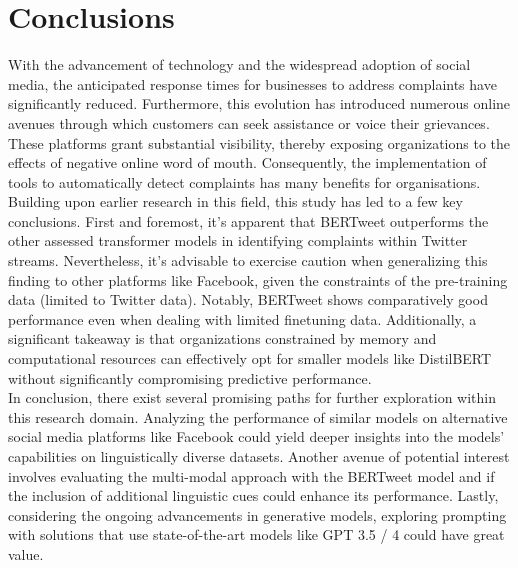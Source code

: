 \chapter{Conclusions}

With the advancement of technology and the widespread adoption of social media, the anticipated response times for businesses to address complaints have significantly reduced. Furthermore, this evolution has introduced numerous online avenues through which customers can seek assistance or voice their grievances. These platforms grant substantial visibility, thereby exposing organizations to the effects of negative online word of mouth. Consequently, the implementation of tools to automatically detect complaints has many benefits for organisations.\\

Building upon earlier research in this field, this study has led to a few key conclusions. First and foremost, it's apparent that BERTweet outperforms the other assessed transformer models in identifying complaints within Twitter streams. Nevertheless, it's advisable to exercise caution when generalizing this finding to other platforms like Facebook, given the constraints of the pre-training data (limited to Twitter data). Notably, BERTweet shows comparatively good performance even when dealing with limited finetuning data. Additionally, a significant takeaway is that organizations constrained by memory and computational resources can effectively opt for smaller models like DistilBERT without significantly compromising predictive performance.\\

In conclusion, there exist several promising paths for further exploration within this research domain. Analyzing the performance of similar models on alternative social media platforms like Facebook could yield deeper insights into the models' capabilities on linguistically diverse datasets. Another avenue of potential interest involves evaluating the multi-modal approach with the BERTweet model and if the inclusion of additional linguistic cues could enhance its performance. Lastly, considering the ongoing advancements in generative models, exploring prompting with solutions that use state-of-the-art models like GPT 3.5 / 4 could have great value.
